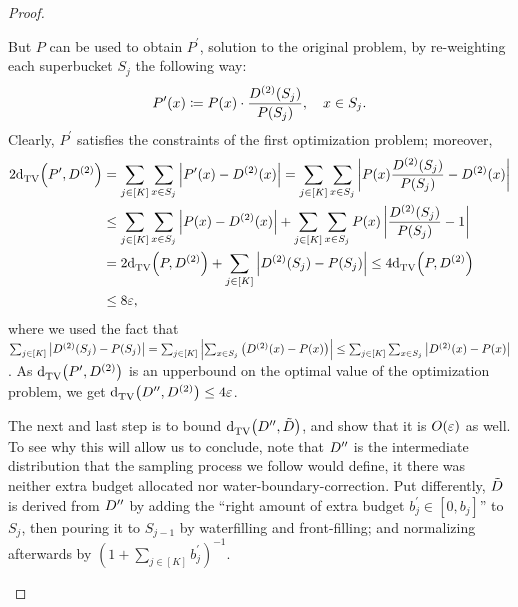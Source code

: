 \begin{proof}
\begin{itemize}
  But $P$ can be used to obtain $P^\prime$, solution to the original problem, by re-weighting each superbucket $S_j$ the following way:
  \[
    P^\prime(x) \coloneqq P(x)\cdot \frac{D^{(2)}(S_j)}{P(S_j)}, \quad x \in S_j.
  \]
  Clearly, $P^\prime$ satisfies the constraints of the first optimization problem; moreover,
  \begin{align*}
    2{\operatorname{d}_{\textrm{TV}}^{}\!\left({P^\prime, D^{(2)} }\right)} &= \sum_{j\in[K]} \sum_{x\in S_j} \left\lvert  P^\prime(x) - D^{(2)}(x) \right\rvert
    = \sum_{j\in[K]} \sum_{x\in S_j} \left\lvert  P(x)\frac{D^{(2)}(S_j)}{P(S_j)} - D^{(2)}(x) \right\rvert \\
    &\leq \sum_{j\in[K]} \sum_{x\in S_j} \left\lvert  P(x) - D^{(2)}(x) \right\rvert + \sum_{j\in[K]} \sum_{x\in S_j} P(x)\left\lvert  \frac{D^{(2)}(S_j)}{P(S_j)} - 1 \right\rvert  \\ 
    &= 2{\operatorname{d}_{\textrm{TV}}^{}\!\left({P, D^{(2)} }\right)} + \sum_{j\in[K]} \left\lvert D^{(2)}(S_j) - P(S_j) \right\rvert \leq 4{\operatorname{d}_{\textrm{TV}}^{}\!\left({P, D^{(2)} }\right)} \\
    &\leq 8\varepsilon,
  \end{align*}
  where we used the fact that $\sum_{j\in[K]} \left\lvert D^{(2)}(S_j) - P(S_j) \right\rvert = \sum_{j\in[K]} \left\lvert \sum_{x\in S_j} \left( D^{(2)}(x) - P(x) \right) \right\rvert \leq \sum_{j\in[K]} \sum_{x\in S_j} \left\lvert D^{(2)}(x) - P(x) \right\rvert$. As ${\operatorname{d}_{\textrm{TV}}^{}\!\left({P^\prime, D^{(2)} }\right)}$ is an upperbound on the optimal value of the optimization problem, we get ${\operatorname{d}_{\textrm{TV}}^{}\!\left({D^{\prime\prime}, D^{(2)} }\right)} \leq 4\varepsilon$.\smallskip
  
  The next and last step is to bound ${\operatorname{d}_{\textrm{TV}}^{}\!\left({D^{\prime\prime}, \tilde{D}}\right)}$, and show that it is $\bigO{\eps}$ as well. To see why this will allow us to conclude, note that $D^{\prime\prime}$ is the intermediate distribution that the sampling process we follow would define, it there was neither extra budget allocated nor \textsf{water-boundary-correction}. Put differently, $\tilde{D}$ is derived from $D^{\prime\prime}$ by adding the ``right amount of extra budget $b^\prime_j \in [0,b_j]$'' to $S_j$, then pouring it to $S_{j-1}$ by waterfilling {and front-filling}; and normalizing afterwards by $(1+\sum_{j\in [K]} b^\prime_j)^{-1}$.
  

\end{itemize}
\end{proof}
